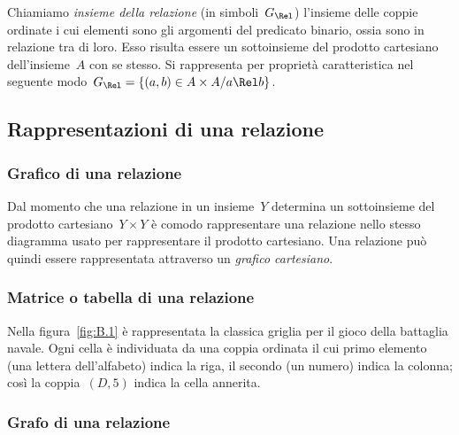 \begin{definizione}
Chiamiamo \emph{insieme della relazione} (in simboli~$G_\Rel$) l'insieme delle 
coppie ordinate i cui
elementi sono gli argomenti del predicato binario, ossia sono in relazione tra 
di loro. Esso risulta essere un
sottoinsieme del prodotto cartesiano dell'insieme~$A$ con se stesso. Si 
rappresenta per proprietà caratteristica nel
seguente modo~$G_\Rel = \lbrace (a,b) \in A \times A / a \Rel b \rbrace$.
\end{definizione}


\subsection{Rappresentazioni di una relazione}
\label{subsec:rel_rappresentazione}

\subsubsection{Grafico di una relazione}

Dal momento che una relazione in un insieme~$Y$ determina un sottoinsieme del 
prodotto cartesiano~$Y \times Y$ è
comodo rappresentare una relazione nello stesso diagramma usato per 
rappresentare il prodotto cartesiano.
Una relazione può quindi essere rappresentata attraverso un \emph{grafico 
cartesiano}.


\subsubsection{Matrice o tabella di una relazione}

Nella figura~\ref{fig:B.1} è rappresentata la classica griglia per il gioco 
della battaglia navale.
Ogni cella è individuata da una coppia ordinata il cui primo elemento (una 
lettera dell'alfabeto) indica la riga,
il secondo (un numero) indica la colonna; così la coppia~$(D,5)$ indica la cella 
annerita.



\subsubsection{Grafo di una relazione}

